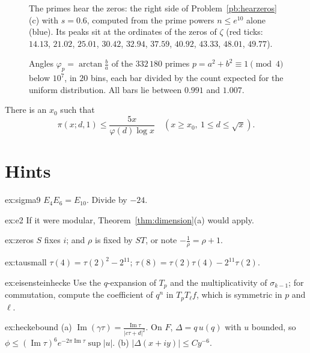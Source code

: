 \begin{figure}[ht]
\centering
{}
\caption{The primes hear the zeros: the right side of Problem~\ref{pb:hearzeros}(c) with $s=0.6$, computed from the prime powers $n\le e^{10}$ alone (blue). Its peaks
sit at the ordinates of the zeros of $\zeta$ (red ticks: $14.13$, $21.02$, $25.01$, $30.42$, $32.94$, $37.59$, $40.92$, $43.33$, $48.01$, $49.77$).}\label{fig:hearzeros}
\end{figure}

\begin{figure}[ht]
\centering
{}
\caption{Angles $\varphi_p=\arctan\frac ba$ of the $332\,180$ primes $p=a^2+b^2\equiv1\pmod4$ below $10^7$, in $20$ bins, each bar divided by the count expected for the
uniform distribution. All bars lie between $0.991$ and $1.007$.}\label{fig:angles}
\end{figure}

There is an $x_0$ such that
\begin{equation}\label{eq:bt13}
\pi(x;d,1)\le\frac{5x}{\varphi(d)\log x}\quad(x\ge x_0,\ 1\le d\le\sqrt x).
\end{equation}

\section{Hints}

\begin{hint}{ex:sigma9}
$E_4E_6=E_{10}$. Divide by $-24$.
\end{hint}
\begin{hint}{ex:e2}
If it were modular, Theorem~\ref{thm:dimension}(a) would apply.
\end{hint}
\begin{hint}{ex:zeros}
$S$ fixes $i$; and $\rho$ is fixed by $ST$, or note $-\frac1\rho=\rho+1$.
\end{hint}
\begin{hint}{ex:tausmall}
$\tau(4)=\tau(2)^2-2^{11}$; $\tau(8)=\tau(2)\tau(4)-2^{11}\tau(2)$.
\end{hint}
\begin{hint}{ex:eisensteinhecke}
Use the $q$-expansion of $T_p$ and the multiplicativity of $\sigma_{k-1}$; for commutation, compute the coefficient of $q^n$ in $T_pT_\ell f$, which is symmetric in $p$ and $\ell$.
\end{hint}
\begin{hint}{ex:heckebound}
(a) $\operatorname{Im}(\gamma\tau)=\frac{\operatorname{Im}\tau}{|c\tau+d|^2}$. On $F$, $\Delta=q\,u(q)$ with $u$ bounded, so $\phi\le(\operatorname{Im}\tau)^6e^{-2\pi\operatorname{Im}\tau}\sup|u|$. (b) $|\Delta(x+iy)|\le Cy^{-6}$.
\end{hint}

